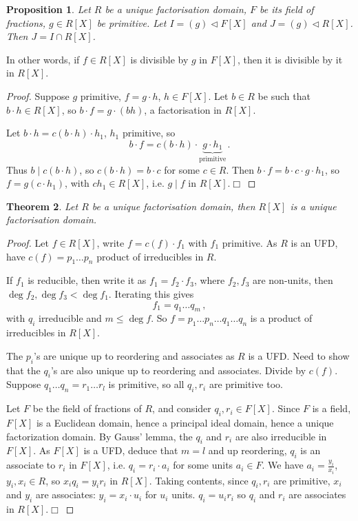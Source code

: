 \documentclass{article}
\theoremstyle{plain}\theoremheaderfont{\normalfont\itshape}\theorembodyfont{\rmfamily}\theoremseparator{.}\newtheorem*{rem}{Remark}\newtheorem*{ex}{Example}\newtheorem*{proof}{Proof}\newtheorem*{altp}{Alternative proof}\newtheorem*{nonex}{Non-Example}
\theoremstyle{plain}\theoremheaderfont{\normalfont\bfseries}\theorembodyfont{\rmfamily}\theoremseparator{.}\newtheorem{thm}{Theorem}[section]\newtheorem{lem}[thm]{Lemma}\newtheorem{prop}[thm]{Proposition}\newtheorem*{cor}{Corollary}\newtheorem{defn}[thm]{Definition}\newtheorem{clm}[thm]{Claim}\newtheorem{clminproof}{Claim}\newtheorem*{notn}{Notation}\newtheorem*{exer}{Exercise}\newtheorem*{lemnn}{Lemma}
\theoremstyle{break}\theoremheaderfont{\normalfont\itshape}\theorembodyfont{\rmfamily}\theoremseparator{.\medskip}\newtheorem*{proofskip}{Proof}\newtheorem*{exs}{Examples}\newtheorem*{rems}{Remarks}\newtheorem*{obs}{Observations}
\theoremstyle{break}\theoremheaderfont{\normalfont\bfseries}\theorembodyfont{\rmfamily}\theoremseparator{.\medskip}\newtheorem{lemskip}[thm]{Lemma}\newtheorem{defnskip}[thm]{Definition}\newtheorem{propskip}[thm]{Proposition}\newtheorem{thmskip}[thm]{Theorem}
\numberwithin{equation}{section}
\newcommand{\qed}{\hfill\ensuremath{\Box}}
\begin{document}
    \begin{prop}
        Let \(R\) be a unique factorisation domain, \(F\) be its field of fractions, \(g\in R[X]\) be primitive. Let \(I=(g)\lhd F[X]\) and \(J=(g)\lhd R[X]\). Then \(J=I\cap R[X]\).
    \end{prop}
    In other words, if \(f\in R[X]\) is divisible by \(g\) in \(F[X]\), then it is divisible by it in \(R[X]\).
    \begin{proof}
        Suppose \(g\) primitive, \(f=g\cdot h\), \(h\in F[X]\). Let \(b\in R\) be such that \(b\cdot h\in R[X]\), so \(b\cdot f=g\cdot(bh)\), a factorisation in \(R[X]\).

        Let \(b\cdot h=c(b\cdot h)\cdot h_1\), \(h_1\) primitive, so
        \[b\cdot f=c(b\cdot h)\cdot\underbrace{g\cdot h_1}_{\text{primitive}}\,.\]
        Thus \(b\mid c(b\cdot h)\), so \(c(b\cdot h)=b\cdot c\) for some \(c\in R\). Then \(b\cdot f=b\cdot c\cdot g\cdot h_1\), so \(f=g(c\cdot h_1)\), with \(c h_1\in R[X]\), i.e. \(g\mid f\) in \(R[X]\).\qed
    \end{proof}
    \begin{thm}
        Let \(R\) be a unique factorisation domain, then \(R[X]\) is a unique factorisation domain.
    \end{thm}
    \begin{proof}
        Let \(f\in R[X]\), write \(f=c(f)\cdot f_1\) with \(f_1\) primitive. As \(R\) is an UFD, have \(c(f)=p_1\dots p_n\) product of irreducibles in \(R\).

        If \(f_1\) is reducible, then write it as \(f_1=f_2\cdot f_3\), where \(f_2,f_3\) are non-units, then \(\deg f_2,\deg f_3<\deg f_1\). Iterating this gives
        \[f_1=q_1\dots q_m\,,\]
        with \(q_i\) irreducible and \(m\le \deg f\). So \(f=p_1\dots p_n\dots q_1\dots q_n\) is a product of irreducibles in \(R[X]\).

        The \(p_i\)'s are unique up to reordering and associates as \(R\) is a UFD. Need to show that the \(q_i\)'s are also unique up to reordering and associates.  Divide by \(c(f)\). Suppose \(q_1\dots q_n=r_1\dots r_l\) is primitive, so all \(q_i,r_i\) are primitive too.
        
        Let \(F\) be the field of fractions of \(R\), and consider \(q_i,r_i\in F[X]\). Since \(F\) is a field, \(F[X]\) is a Euclidean domain, hence a principal ideal domain, hence a unique factorization domain. By Gauss' lemma, the \(q_i\) and \(r_i\) are also irreducible in \(F[X]\). As \(F[X]\) is a UFD, deduce that \(m=l\) and up reordering, \(q_i\) is an associate to \(r_i\) in \(F[X]\), i.e. \(q_i=r_i\cdot a_i\) for some units \(a_i\in F\). We have \(a_i=\frac{y_i}{x_i}\), \(y_i,x_i\in R\), so \(x_iq_i=y_ir_i\) in \(R[X]\). Taking contents, since \(q_i,r_i\) are primitive, \(x_i\) and \(y_i\) are associates: \(y_i=x_i\cdot u_i\) for \(u_i\) units. \(q_i=u_ir_i\) so \(q_i\) and \(r_i\) are associates in \(R[X]\).\qed
    \end{proof}
\end{document}
